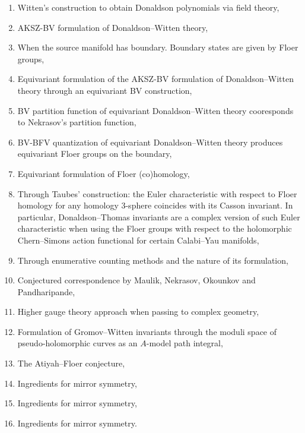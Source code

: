 \documentclass[11pt,colorinlistoftodos]{amsart}
\numberwithin{equation}{subsection}
\theoremstyle{plain}
\theoremstyle{definition}
\theoremstyle{remark}
\begin{document}
\begin{enumerate}[I]
    \item Witten's construction to obtain Donaldson polynomials via field theory,
    \item AKSZ-BV formulation of Donaldson--Witten theory,
    \item When the source manifold has boundary. Boundary states are given by Floer groups,
    \item Equivariant formulation of the AKSZ-BV formulation of Donaldson--Witten theory through an equivariant BV construction,
    \item BV partition function of equivariant Donaldson--Witten theory cooresponds to Nekrasov's partition function,
    \item BV-BFV quantization of equivariant Donaldson--Witten theory produces equivariant Floer groups on the boundary,
    \item Equivariant formulation of Floer (co)homology,
    \item Through Taubes' construction: the Euler characteristic with respect to Floer homology for any homology 3-sphere coincides with its Casson invariant. In particular, Donaldson--Thomas invariants are a complex version of such Euler characteristic when using the Floer groups with respect to the holomorphic Chern--Simons action functional for certain Calabi--Yau manifolds,
    \item Through enumerative counting methods and the nature of its formulation, 
    \item Conjectured correspondence by Maulik, Nekrasov, Okounkov and Pandharipande,
    \item Higher gauge theory approach when passing to complex geometry,
    \item Formulation of Gromov--Witten invariants through the moduli space of pseudo-holomorphic curves as an $A$-model path integral,
    \item The Atiyah--Floer conjecture,
    \item Ingredients for mirror symmetry,
    \item Ingredients for mirror symmetry,
    \item Ingredients for mirror symmetry.
    \end{enumerate}
\end{document}
